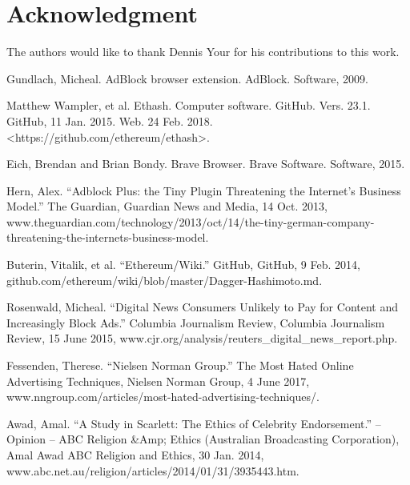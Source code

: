 \documentclass[runningheads]{llncs}
\begin{document}


\section*{Acknowledgment}
The authors would like to thank Dennis Your for his contributions to this work.

\begin{thebibliography}{1}
 Gundlach, Micheal. AdBlock browser extension. AdBlock. Software, 2009.

Matthew Wampler, et al. Ethash. Computer software. GitHub. Vers. 23.1. GitHub, 11 Jan. 2015. Web. 24 Feb. 2018. <https://github.com/ethereum/ethash>. 

 Eich, Brendan and Brian Bondy. Brave Browser. Brave Software. Software, 2015.

 Hern, Alex. “Adblock Plus: the Tiny Plugin Threatening the Internet's Business Model.” The Guardian, Guardian News and Media, 14 Oct. 2013, www.theguardian.com/technology/2013/oct/14/the-tiny-german-company-threatening-the-internets-business-model.

 Buterin, Vitalik, et al. “Ethereum/Wiki.” GitHub, GitHub, 9 Feb. 2014, github.com/ethereum/wiki/blob/master/Dagger-Hashimoto.md. 

 Rosenwald, Micheal. “Digital News Consumers Unlikely to Pay for Content and Increasingly Block Ads.” Columbia Journalism Review, Columbia Journalism Review, 15 June 2015, www.cjr.org/analysis/reuters\_digital\_news\_report.php.

 Fessenden, Therese. “Nielsen Norman Group.” The Most Hated Online Advertising Techniques, Nielsen Norman Group, 4 June 2017, www.nngroup.com/articles/most-hated-advertising-techniques/.

 Awad, Amal. “A Study in Scarlett: The Ethics of Celebrity Endorsement.” – Opinion – ABC Religion \&Amp; Ethics (Australian Broadcasting Corporation), Amal Awad ABC Religion and Ethics, 30 Jan. 2014, www.abc.net.au/religion/articles/2014/01/31/3935443.htm.



\end{thebibliography}
\end{document}
